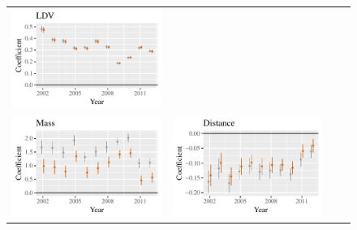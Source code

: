\documentclass{article}
\begin{document}
\begin{figure}
\begin{tabular}{*{4}{@{}c}@{}}
\includegraphics[scale=.6]{draft_figures/rl_plots/LDV.pdf}   \\
\includegraphics[scale=.6]{draft_figures/rl_plots/Mass.pdf}    & 
\includegraphics[scale=.6]{draft_figures/rl_plots/Distance.pdf}   & 

\end{tabular}
\end{figure}
\end{document}
